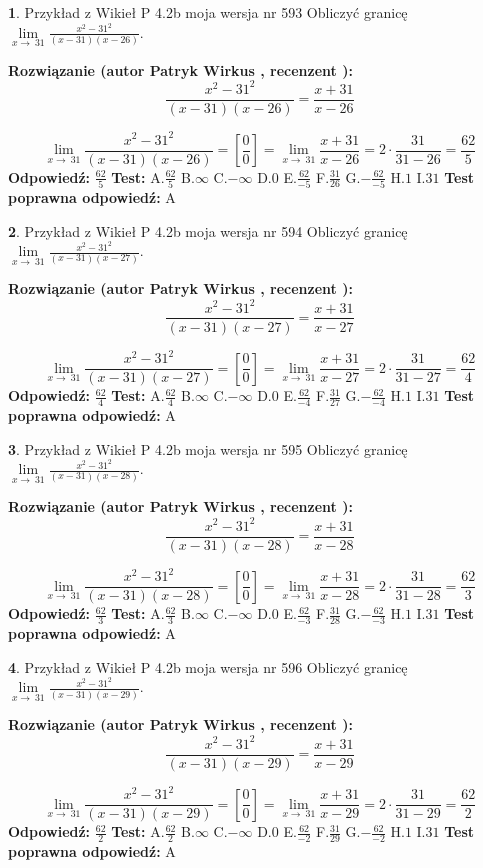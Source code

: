 \documentclass[12pt, a4paper]{article}
\theoremstyle{definition} %
\newtheorem{zad}{}
\newcommand{\zadStart}[1]{\begin{zad}#1\newline}
\newcommand{\zadStop}{\end{zad}}
\newcommand{\rozwStart}[2]{\noindent \textbf{Rozwiązanie (autor #1 , recenzent #2): }\newline}
\newcommand{\rozwStop}{\newline}
\newcommand{\odpStart}{\noindent \textbf{Odpowiedź:}\newline}
\newcommand{\odpStop}{\newline}
\newcommand{\testStart}{\noindent \textbf{Test:}\newline}
\newcommand{\testStop}{\newline}
\newcommand{\kluczStart}{\noindent \textbf{Test poprawna odpowiedź:}\newline}
\newcommand{\kluczStop}{\newline}
\begin{document}
\zadStart{Przykład z Wikieł P 4.2b moja wersja nr 593}
Obliczyć granicę $\lim\limits_{x\to\ 31}\frac{x^{2}-31^{2}}{(x-31)(x-26)}$.
\zadStop
\rozwStart{Patryk Wirkus}{}
$$\frac{x^{2}-31^{2}}{(x-31)(x-26)}=\frac{x+31}{x-26}$$

$$\lim\limits_{x\to\ 31}\frac{x^{2}-31^{2}}{(x-31)(x-26)}=[\frac{0}{0}]=\lim\limits_{x\to\ 31}\frac{x+31}{x-26}=2 \cdot \frac{31}{31-26} = \frac{62}{5}$$
\rozwStop
\odpStart
$\frac{62}{5}$
\odpStop
\testStart
A.$\frac{62}{5}$
B.$\infty$
C.$-\infty$
D.$0$
E.$\frac{62}{-5}$
F.$\frac{31}{26}$
G.$-\frac{62}{-5}$
H.$1$
I.$31$
\testStop
\kluczStart
A
\kluczStop



\zadStart{Przykład z Wikieł P 4.2b moja wersja nr 594}
Obliczyć granicę $\lim\limits_{x\to\ 31}\frac{x^{2}-31^{2}}{(x-31)(x-27)}$.
\zadStop
\rozwStart{Patryk Wirkus}{}
$$\frac{x^{2}-31^{2}}{(x-31)(x-27)}=\frac{x+31}{x-27}$$

$$\lim\limits_{x\to\ 31}\frac{x^{2}-31^{2}}{(x-31)(x-27)}=[\frac{0}{0}]=\lim\limits_{x\to\ 31}\frac{x+31}{x-27}=2 \cdot \frac{31}{31-27} = \frac{62}{4}$$
\rozwStop
\odpStart
$\frac{62}{4}$
\odpStop
\testStart
A.$\frac{62}{4}$
B.$\infty$
C.$-\infty$
D.$0$
E.$\frac{62}{-4}$
F.$\frac{31}{27}$
G.$-\frac{62}{-4}$
H.$1$
I.$31$
\testStop
\kluczStart
A
\kluczStop



\zadStart{Przykład z Wikieł P 4.2b moja wersja nr 595}
Obliczyć granicę $\lim\limits_{x\to\ 31}\frac{x^{2}-31^{2}}{(x-31)(x-28)}$.
\zadStop
\rozwStart{Patryk Wirkus}{}
$$\frac{x^{2}-31^{2}}{(x-31)(x-28)}=\frac{x+31}{x-28}$$

$$\lim\limits_{x\to\ 31}\frac{x^{2}-31^{2}}{(x-31)(x-28)}=[\frac{0}{0}]=\lim\limits_{x\to\ 31}\frac{x+31}{x-28}=2 \cdot \frac{31}{31-28} = \frac{62}{3}$$
\rozwStop
\odpStart
$\frac{62}{3}$
\odpStop
\testStart
A.$\frac{62}{3}$
B.$\infty$
C.$-\infty$
D.$0$
E.$\frac{62}{-3}$
F.$\frac{31}{28}$
G.$-\frac{62}{-3}$
H.$1$
I.$31$
\testStop
\kluczStart
A
\kluczStop



\zadStart{Przykład z Wikieł P 4.2b moja wersja nr 596}
Obliczyć granicę $\lim\limits_{x\to\ 31}\frac{x^{2}-31^{2}}{(x-31)(x-29)}$.
\zadStop
\rozwStart{Patryk Wirkus}{}
$$\frac{x^{2}-31^{2}}{(x-31)(x-29)}=\frac{x+31}{x-29}$$

$$\lim\limits_{x\to\ 31}\frac{x^{2}-31^{2}}{(x-31)(x-29)}=[\frac{0}{0}]=\lim\limits_{x\to\ 31}\frac{x+31}{x-29}=2 \cdot \frac{31}{31-29} = \frac{62}{2}$$
\rozwStop
\odpStart
$\frac{62}{2}$
\odpStop
\testStart
A.$\frac{62}{2}$
B.$\infty$
C.$-\infty$
D.$0$
E.$\frac{62}{-2}$
F.$\frac{31}{29}$
G.$-\frac{62}{-2}$
H.$1$
I.$31$
\testStop
\kluczStart
A
\kluczStop
\end{document}
